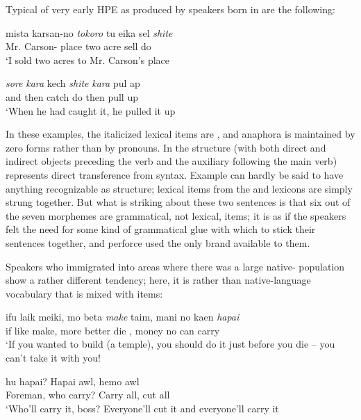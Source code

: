 Typical of very early HPE as produced by speakers born in  are the following:

\ea\label{ex:1}
 \gll mista karsan-no \emph{to}\emph{k}\emph{oro} tu eika sel \emph{shite}\\
  Mr. {Carson-\POSS} place two acre sell do \\
\glt  `I sold two acres to Mr. Carson's place
\z

\ea\label{ex:2}
 \gll \emph{sore} \emph{kara} kech \emph{shite} \emph{kara} pul ap \\
and then catch do then pull up\\
\glt  `When he had caught it, he pulled it up
\z


\noindent In these examples, the italicized lexical items are , and ana\-phora is maintained by zero forms rather than by pronouns. In  the structure (with both direct and indirect objects preceding the verb and the auxiliary following the main verb) represents direct transference from  syntax. Example  can hardly be said to have anything recognizable as structure; lexical items from the  and  lexicons are simply strung together. But what is striking about these two sentences is that six out of the seven  morphemes are grammatical, not lexical, items; it is as if the speakers felt the need for some kind of grammatical glue with which to stick their sentences together, and perforce used the only brand available to them.

Speakers who immigrated into areas where there was a large native- population show a rather different tendency; here, it is  rather than native-language vocabulary that is mixed with  items:

\ea\label{ex:3}
 \gll ifu laik meiki, mo beta \emph{make} taim, mani no kaen \emph{hapai} \\
if like make, more better die , money no can carry \\
\glt  `If you wanted to build (a temple), you should do it just before you die -- you can't take it with you!
\z

\ea\label{ex:4}
 hu {hapai?} {Hapai} awl, {hemo} awl\\
 Foreman, who {carry?} Carry all, cut all\\
\glt  `Who'll carry it, boss? Everyone'll cut it and everyone'll carry it
\z

